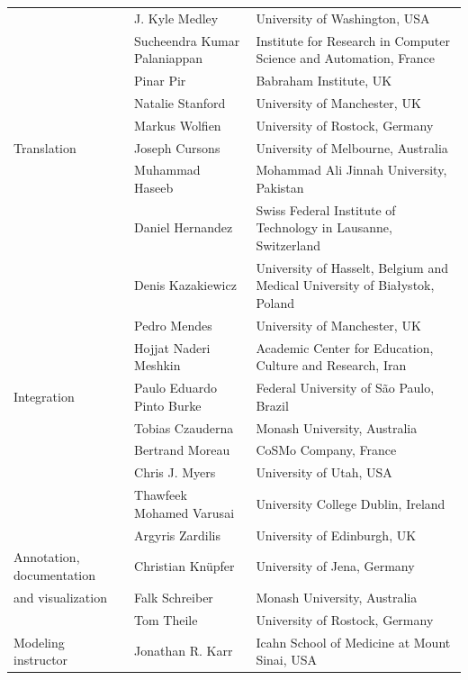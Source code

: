 \documentclass[journal,transmag]{IEEEtran}
\begin{document}
\begin{table}[ht!]
\begin{tabularx}{\textwidth}{l||l||X}
                          & J. Kyle Medley                   & University of Washington, USA\\
                          & Sucheendra Kumar Palaniappan     & Institute for Research in Computer Science and Automation, France\\
                          & Pinar Pir                        & Babraham Institute, UK\\
                          & Natalie Stanford                 & University of Manchester, UK\\
                          & Markus Wolfien                   & University of Rostock, Germany\\\hline
Translation               & Joseph Cursons                   & University of Melbourne, Australia\\
                          & Muhammad Haseeb                  & Mohammad Ali Jinnah University, Pakistan\\
                          & Daniel Hernandez                 & Swiss Federal Institute of Technology in Lausanne, Switzerland\\
                          & Denis Kazakiewicz                & University of Hasselt, Belgium and Medical University of Białystok, Poland\\
                          & Pedro Mendes                     & University of Manchester, UK\\
                          & Hojjat Naderi Meshkin            & Academic Center for Education, Culture and Research, Iran\\\hline
Integration               & Paulo Eduardo Pinto Burke        & Federal University of S\~ao Paulo, Brazil\\
                          & Tobias Czauderna                 & Monash University, Australia\\
                          & Bertrand Moreau                  & CoSMo Company, France\\
                          & Chris J. Myers                   & University of Utah, USA\\
                          & Thawfeek Mohamed Varusai         & University College Dublin, Ireland\\
                          & Argyris Zardilis                 & University of Edinburgh, UK\\\hline
Annotation, documentation & Christian Kn\"upfer              & University of Jena, Germany\\
and visualization         & Falk Schreiber                   & Monash University, Australia\\
                          & Tom Theile                       & University of Rostock, Germany\\\hline
Modeling instructor       & Jonathan R. Karr                 & Icahn School of Medicine at Mount Sinai, USA\\\hline
\end{tabularx}
\end{table}
\end{document}
